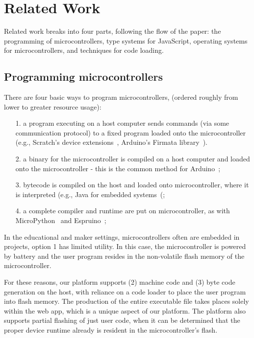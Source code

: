 \section{Related Work}
\label{sec:related}

Related work breaks into four parts, following the
flow of the paper: the programming of microcontrollers,
type systems for JavaScript, operating systems
for microcontrollers, and techniques for code loading.

\subsection{Programming microcontrollers}

There are four basic ways to program microcontrollers,
(ordered roughly from lower to greater resource usage):
\begin{itemize}
\item[1.] a program executing on a host computer sends commands (via some communication protocol) 
to a fixed program loaded onto the microcontroller (e.g., Scratch's
device extensions~\cite{ScratchCACM2009}, Arduino's Firmata library~\cite{Firmata}).
\item[2.] a binary for the microcontroller is compiled on a host computer and loaded onto the microcontroller -
this is the common method for Arduino~\cite{buildingArduino2014};
\item[3.] bytecode is compiled on the host and loaded onto microcontroller, where it is interpreted
(e.g., Java for embedded systems~\cite{ClausenTOPLAS}(;
\item[4.] a complete compiler and runtime are put on microcontroller, as with MicroPython~\cite{MicroPython} 
and Espruino~\cite{Espruino};
\end{itemize}

In the educational and maker settings, microcontrollers often are embedded in projects,
option 1 has limited utility. In this case, the microcontroller is powered by battery and
the user program resides in the non-volatile flash memory of the microcontroller. 

For these reasons, our platform supports (2) machine code and (3) byte code generation on the host,
with reliance on a code loader to place the user program into flash memory. 
The production of the entire executable file
takes places solely within the web app, which is a unique aspect of our platform.
The platform also supports partial flashing of just user code, 
when it can be determined that the proper device runtime already is resident in the microcontroller's flash.

